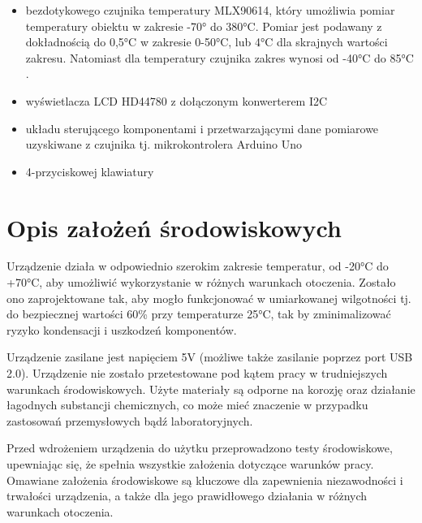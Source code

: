     \begin{itemize}

        \item bezdotykowego czujnika temperatury MLX90614, który umożliwia pomiar temperatury obiektu w zakresie -70° do 380°C. Pomiar jest podawany z dokładnością do 0,5°C w zakresie 0-50°C, lub 4°C dla skrajnych wartości zakresu. Natomiast dla temperatury czujnika zakres wynosi od -40°C do 85°C \cite{3}.
        \vspace{12pt}
        \item wyświetlacza LCD HD44780 z dołączonym konwerterem I2C
        \vspace{12pt}
        \item układu sterującego komponentami i przetwarzającymi dane pomiarowe uzyskiwane z czujnika tj. mikrokontrolera Arduino Uno
        \vspace{12pt}
        \item 4-przyciskowej klawiatury 

    \end{itemize}

    \section{Opis założeń środowiskowych}
    
Urządzenie działa w odpowiednio szerokim zakresie temperatur, od -20°C do +70°C, aby umożliwić wykorzystanie w różnych warunkach otoczenia. Zostało ono zaprojektowane tak, aby mogło funkcjonować w umiarkowanej wilgotności tj. do bezpiecznej wartości 60\% przy temperaturze 25°C, tak by zminimalizować ryzyko kondensacji i uszkodzeń komponentów. 

\vspace{12pt}

Urządzenie zasilane jest napięciem 5V (możliwe także zasilanie poprzez port USB 2.0). Urządzenie nie zostało przetestowane pod kątem pracy w trudniejszych warunkach środowiskowych. Użyte materiały są odporne na korozję oraz działanie łagodnych substancji chemicznych, co może mieć znaczenie w przypadku zastosowań przemysłowych bądź laboratoryjnych. 

\vspace{12pt}

Przed wdrożeniem urządzenia do użytku przeprowadzono testy środowiskowe, upewniając się, że spełnia wszystkie założenia dotyczące warunków pracy. Omawiane założenia środowiskowe są kluczowe dla zapewnienia niezawodności i trwałości urządzenia, a także dla jego prawidłowego działania w różnych warunkach otoczenia.

